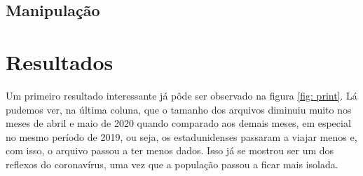 \documentclass{article}
\begin{document}
\subsection{Manipulação}




\section{Resultados}

Um primeiro resultado interessante já pôde ser observado na figura \ref{fig: print}. Lá pudemos ver, na última coluna, que o tamanho dos arquivos diminuiu muito nos meses de abril e maio de 2020 quando comparado aos demais meses, em especial no mesmo período de 2019, ou seja, os estadunidenses passaram a viajar menos e, com isso, o arquivo passou a ter menos dados. Isso já se mostrou ser um dos reflexos do coronavírus, uma vez que a população passou a ficar mais isolada.



\printbibliography
\end{document}
